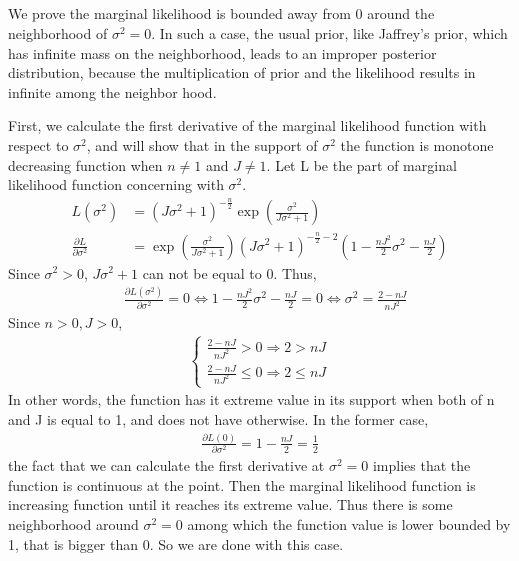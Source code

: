 \documentclass{article}
\begin{document}
	\subsection{}
		We prove the marginal likelihood is bounded away from 0 around the neighborhood of $\sigma^2 = 0$. In such a case, the usual prior, like Jaffrey's prior, which has infinite mass on the neighborhood, leads to an improper posterior distribution, because the multiplication of prior and the likelihood results in infinite among the neighbor hood. 
		\par
		First, we calculate the first derivative of the marginal likelihood function with respect to $\sigma^2$, and will show that in the support of $\sigma^2$ the function is monotone decreasing function when $n \neq 1$ and $J \neq 1$. Let L be the part of marginal likelihood function concerning with $\sigma^2$.
		\begin{align}
			L(\sigma^2) &= (J\sigma^2 + 1)^{-\frac{n}{2}} \exp \left( \frac{\sigma^2}{J\sigma^2 + 1}\right) \nonumber \\
			\frac{\partial L}{\partial \sigma^2} &= \exp \left( \frac{\sigma^2}{J\sigma^2 + 1} \right) (J \sigma^2 + 1)^{-\frac{n}{2}-2}\left( 1 - \frac{nJ^2}{2}\sigma^2 - \frac{nJ}{2}\right)
		\end{align}
		Since $\sigma^2 > 0$, $J\sigma^2 +1$ can not be equal to 0. Thus,
		\begin{align*}
			&\frac{\partial L(\sigma^2)}{\partial \sigma^2} = 0
			\Leftrightarrow 1- \frac{nJ^2}{2}\sigma^2 - \frac{nJ}{2} = 0
			\Leftrightarrow \sigma^2 = \frac{2 - nJ}{nJ^2}
		\end{align*}
		Since $n > 0, J >0$, 
		\begin{align*}
			\begin{cases}
			\frac{2 - nJ}{nJ^2} > 0 \Rightarrow 2 > nJ \\
			\frac{2 - nJ}{nJ^2} \le 0 \Rightarrow 2 \le nJ
			\end{cases}
		\end{align*}
		In other words, the function has it extreme value in its support when both of n and J is equal to 1, and does not have otherwise. 
		In the former case, 
		\begin{align*}
			\frac{\partial L(0)}{\partial \sigma^2} = 1 - \frac{nJ}{2} = \frac{1}{2}
		\end{align*}
		the fact that we can calculate the first derivative at $\sigma^2 = 0$ implies that the function is continuous at the point. Then the marginal likelihood function is increasing function until it reaches its extreme value. Thus there is some neighborhood around $\sigma^2 = 0$ among which the function value is lower bounded by 1, that is bigger than 0. So we are done with this case.
\end{document}
